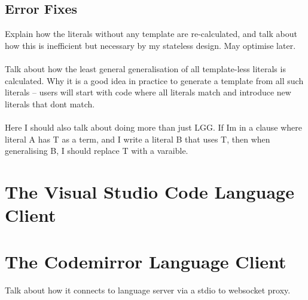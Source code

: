 \documentclass[../main.tex]{subfiles}
\begin{document}
\subsection{Error Fixes}
Explain how the literals without any template are re-calculated, and talk about how this is inefficient but necessary by my stateless design. May optimise later. 
\\ 
\\ 
Talk about how the least general generalisation of all template-less literals is calculated. Why it is a good idea in practice to generate a template from all such literals -- users will start with code where all literals match and introduce new literals that dont match. 
\\ 
\\ 
Here I should also talk about doing more than just LGG. If Im in a clause where literal A has T as a term, and I write a literal B that uses T, then when generalising B, I should replace T with a varaible.


\section{The Visual Studio Code Language Client}

\section{The Codemirror Language Client}
Talk about how it connects to language server via a stdio to websocket proxy.
\end{document}
